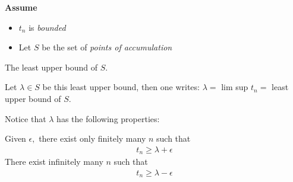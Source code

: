 \textbf{Assume}
\begin{itemize}
  \item $t_n$ is \emph{bounded}
  \item Let $S$ be the set of \emph{points of accumulation}
\end{itemize}

\begin{defn}
  The least upper bound of $S.$
\end{defn}

Let $\lambda \in S$ be this least upper bound, then one writes: $\lambda = $ lim sup $t_n =$
least upper bound of $S.$

Notice that $\lambda$ has the following properties:
\begin{thm}
  Given $\epsilon,$ there exist only finitely many $n$ such that
  \begin{align*}
    t_n \geq \lambda + \epsilon
  \end{align*}
  There exist infinitely many $n$ such that
  \begin{align*}
    t_n \geq \lambda - \epsilon
  \end{align*}
\end{thm}

\newpage